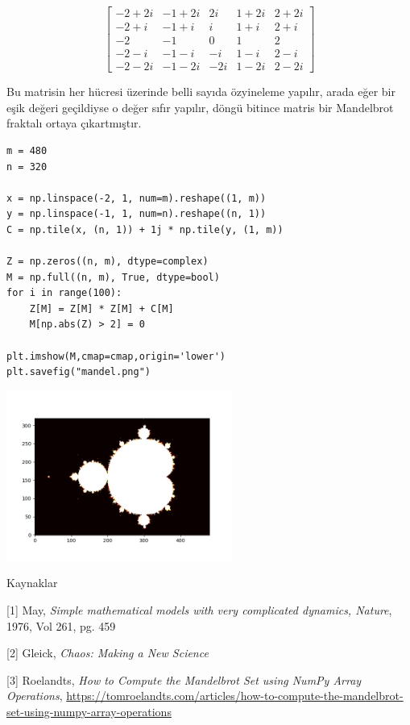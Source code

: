 \documentclass[12pt,fleqn]{article}\usepackage{../../common}
\begin{document}
$$
\left[\begin{array}{ccccc}
-2+2i & -1+2i & 2i  & 1+2i & 2+2i \\
-2+i  & -1+i  & i   & 1+i  & 2+i  \\
-2    &  -1   & 0   &  1   &  2   \\
-2-i  & -1-i  & -i  & 1-i  &  2-i \\
-2-2i & -1-2i & -2i & 1-2i &  2-2i  
\end{array}\right]
$$

Bu matrisin her hücresi üzerinde belli sayıda özyineleme yapılır, arada eğer bir
eşik değeri geçildiyse o değer sıfır yapılır, döngü bitince matris bir
Mandelbrot fraktalı ortaya çıkartmıştır.

\begin{verbatim}
m = 480
n = 320
 
x = np.linspace(-2, 1, num=m).reshape((1, m))
y = np.linspace(-1, 1, num=n).reshape((n, 1))
C = np.tile(x, (n, 1)) + 1j * np.tile(y, (1, m))
 
Z = np.zeros((n, m), dtype=complex)
M = np.full((n, m), True, dtype=bool)
for i in range(100):
    Z[M] = Z[M] * Z[M] + C[M]
    M[np.abs(Z) > 2] = 0

plt.imshow(M,cmap=cmap,origin='lower')
plt.savefig("mandel.png")
\end{verbatim}

\includegraphics[width=20em]{mandel.png}


Kaynaklar

[1] May, {\em Simple mathematical models with very complicated dynamics, Nature}, 1976, Vol 261, pg. 459

[2] Gleick, {\em Chaos: Making a New Science}

[3] Roelandts, {\em How to Compute the Mandelbrot Set using NumPy Array Operations},
    \url{https://tomroelandts.com/articles/how-to-compute-the-mandelbrot-set-using-numpy-array-operations}
\end{document}
